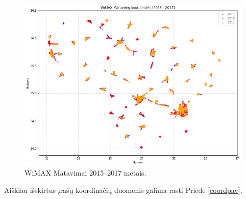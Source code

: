 \documentclass{VUMIFPSbakalaurinis}
\begin{document}
\begin{figure}[H]
	\centering
	\includegraphics[scale=0.5]{img/WiMAX-0}
	\caption{WiMAX Matavimai 2015–2017 metais.}
	\label{img:WiMAX-0}
\end{figure}
Aiškiau išskirtus įrašų koordinačių duomenis galima rasti Priede \ref{coordpav}.
\end{document}
